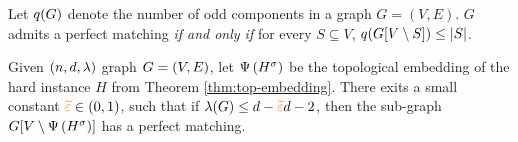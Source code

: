 \documentclass[11pt]{article}
\begin{document}


\begin{lemma}\label{lemma:tutte-criterion}
Let $q(G)$ denote the number of odd components in a graph $G=(V,E)$. 
$G$ admits a perfect matching \emph{if and only if} for every $S \subseteq V$, $q(G[V \setminus S]) \leq |S|$.
\end{lemma}


\begin{theorem}\label{thm:perfect-matching}
Given $(n, d, \lambda)$ graph $G=(V,E)$, let $\Psi\left({H}^{\sigma}\right)$ be the topological embedding of the hard instance $H$ from Theorem \ref{thm:top-embedding}.
There exits a small constant $\textcolor{orange}{\widetilde{\varepsilon}} \in (0,1)$, such that 
if $\lambda(G) \leq d - \textcolor{orange}{\widetilde{\varepsilon}} d - 2$, then the sub-graph $G[V \setminus \Psi\left({H}^{\sigma}\right)]$ has a perfect matching.	
	
\end{theorem}
\end{document}
